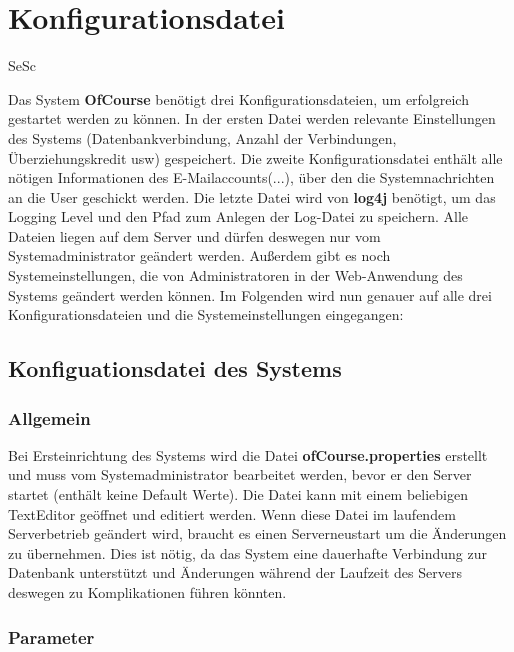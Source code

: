 \chapter{Konfigurationsdatei}
\begin{tiny}
	SeSc
\end{tiny}

Das System \textbf{OfCourse} benötigt drei Konfigurationsdateien, um erfolgreich gestartet werden zu können. In der ersten Datei werden relevante Einstellungen des Systems (Datenbankverbindung, Anzahl der Verbindungen, Überziehungskredit usw) gespeichert. Die zweite Konfigurationsdatei enthält alle nötigen Informationen des E-Mailaccounts(...), über den die Systemnachrichten an die User geschickt werden. Die letzte Datei wird von \textbf{log4j} benötigt, um das Logging Level und den Pfad zum Anlegen der Log-Datei zu speichern. Alle Dateien liegen auf dem Server und dürfen deswegen nur vom Systemadministrator geändert werden. Außerdem gibt es noch Systemeinstellungen, die von Administratoren in der Web-Anwendung des Systems geändert werden können. Im Folgenden wird nun genauer auf alle drei Konfigurationsdateien und die Systemeinstellungen eingegangen:

\section{Konfiguationsdatei des Systems}
\subsection{Allgemein}

Bei Ersteinrichtung des Systems wird die Datei \textbf{ofCourse.properties} erstellt und muss vom Systemadministrator bearbeitet werden, bevor er den Server startet (enthält keine Default Werte). Die Datei kann mit einem beliebigen TextEditor geöffnet und editiert werden. Wenn diese Datei im laufendem Serverbetrieb geändert wird, braucht es einen Serverneustart um die Änderungen zu übernehmen. Dies ist nötig, da das System eine dauerhafte Verbindung zur Datenbank unterstützt und Änderungen während der Laufzeit des Servers deswegen zu Komplikationen führen könnten.


\subsection{Parameter}

